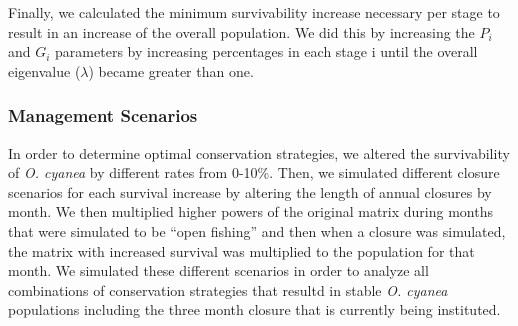 \documentclass[
]{article}
\begin{document}
Finally, we calculated the minimum survivability increase necessary per stage to result in an increase of the overall population. We did this by increasing the \(P_i\) and \(G_i\) parameters by increasing percentages in each stage i until the overall eigenvalue (\(\lambda\)) became greater than one.

\hypertarget{management-scenarios}{%
\subsubsection{Management Scenarios}\label{management-scenarios}}

In order to determine optimal conservation strategies, we altered the survivability of \emph{O. cyanea} by different rates from 0-10\%. Then, we simulated different closure scenarios for each survival increase by altering the length of annual closures by month. We then multiplied higher powers of the original matrix during months that were simulated to be ``open fishing'' and then when a closure was simulated, the matrix with increased survival was multiplied to the population for that month. We simulated these different scenarios in order to analyze all combinations of conservation strategies that resultd in stable \emph{O. cyanea} populations including the three month closure that is currently being instituted.

\begin{table}

\caption{\label{tab:LifeHistory}Existing research and information on the per-stage duration of \emph{O. cyanea}. All existing estimates are from Heukelem (1973), Heukelem (1976), Guard \& Mgaya (2003), Humber et al. (2006), Aina (2009). Note: Heukelem (1976) estimate the time to maturity to be 10-13 months (i.e.~stages 1-3 combined). \label{LifeHistory}}
\centering
{}
\end{table}
\end{document}
